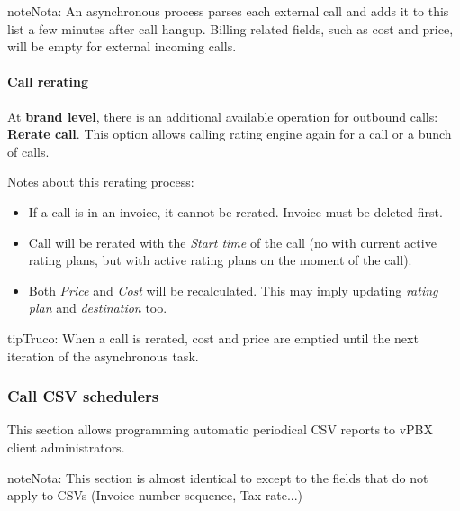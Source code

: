 \documentclass[letterpaper,10pt,spanish]{sphinxmanual}
\begin{document}
\begin{notice}{note}{Nota:}
An asynchronous process parses each external call and adds it to this list a few minutes after call hangup. Billing related fields, such as cost and price, will be empty for external incoming calls.
\end{notice}


\paragraph{Call rerating}
\label{administration_portal/client/vpbx/calls/external_calls:call-rerating}
At \textbf{brand level}, there is an additional available operation for outbound calls: \textbf{Rerate call}. This option allows calling rating engine again for a call or a bunch of calls.

Notes about this rerating process:
\begin{itemize}
\item {} 
If a call is in an invoice, it cannot be rerated. Invoice must be deleted first.

\item {} 
Call will be rerated with the \emph{Start time} of the call (no with current active rating plans, but with active rating plans
on the moment of the call).

\item {} 
Both \emph{Price} and \emph{Cost} will be recalculated. This may imply updating \emph{rating plan} and \emph{destination} too.

\end{itemize}

\begin{notice}{tip}{Truco:}
When a call is rerated, cost and price are emptied until the next iteration of the asynchronous task.
\end{notice}
\begin{quote}
\end{quote}


\subsubsection{Call CSV schedulers}
\label{administration_portal/client/vpbx/calls/call_csv_schedulers:call-csv-schedulers}\label{administration_portal/client/vpbx/calls/call_csv_schedulers::doc}
This section allows programming automatic periodical CSV reports to vPBX client administrators.

\begin{notice}{note}{Nota:}
This section is almost identical to {\hyperref[administration_portal/brand/invoicing/invoice_schedulers:invoice\string-schedulers]{}} except to the
fields that do not apply to CSVs (Invoice number sequence, Tax rate...)
\end{notice}
\end{document}
